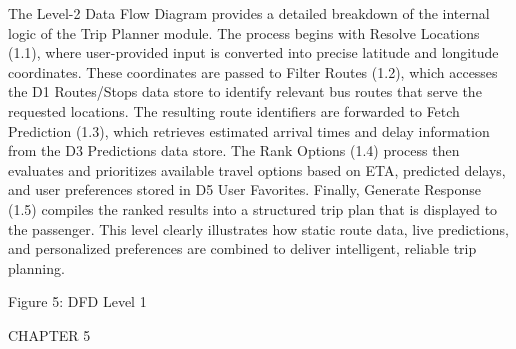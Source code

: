                 The Level-2 Data Flow Diagram provides a detailed breakdown of the internal logic of the Trip Planner module. The process begins with Resolve Locations (1.1), where user-provided input is converted into precise latitude and longitude coordinates. These coordinates are passed to Filter Routes (1.2), which accesses the D1 Routes/Stops data store to identify relevant bus routes that serve the requested locations. The resulting route identifiers are forwarded to Fetch Prediction (1.3), which retrieves estimated arrival times and delay information from the D3 Predictions data store. The Rank Options (1.4) process then evaluates and prioritizes available travel options based on ETA, predicted delays, and user preferences stored in D5 User Favorites. Finally, Generate Response (1.5) compiles the ranked results into a structured trip plan that is displayed to the passenger. This level clearly illustrates how static route data, live predictions, and personalized preferences are combined to deliver intelligent, reliable trip planning.
                                  

Figure 5: DFD Level 1 


CHAPTER 5	

